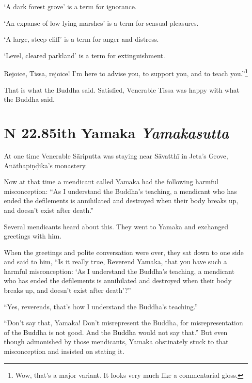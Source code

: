 \documentclass[12pt,openany]{book}%
\newcommand*{\suttatitleacronym}[1]{\smaller[2]{#1}\vspace*{.3em}}
\newcommand*{\suttatitletranslation}[1]{\linebreak{#1}}
\newcommand*{\suttatitleroot}[1]{\linebreak\smaller[2]\itshape{#1}}
\newcommand*{\tocacronym}[1]{\hspace*{-3.3em}{#1}\quad}
\newcommand*{\toctranslation}[1]{#1}
\newcommand*{\tocroot}[1]{(\textit{#1})}
\begin{document}
‘A dark forest grove’ is a term for ignorance. 

‘An expanse of low-lying marshes’ is a term for sensual pleasures. 

‘A large, steep cliff’ is a term for anger and distress. 

‘Level, cleared parkland’ is a term for extinguishment. 

Rejoice, Tissa, rejoice! I’m here to advise you, to support you, and to teach you.”\footnote{Wow, that’s a major variant. It looks very much like a commentarial gloss. } 

That is what the Buddha said. Satisfied, Venerable Tissa was happy with what the Buddha said. 

%
\section*{{\suttatitleacronym SN 22.85}{\suttatitletranslation With Yamaka }{\suttatitleroot Yamakasutta}}
\addcontentsline{toc}{section}{\tocacronym{SN 22.85} \toctranslation{With Yamaka } \tocroot{Yamakasutta}}

At one time Venerable \textsanskrit{Sāriputta} was staying near \textsanskrit{Sāvatthī} in Jeta’s Grove, \textsanskrit{Anāthapiṇḍika}’s monastery. 

Now at that time a mendicant called Yamaka had the following harmful misconception: “As I understand the Buddha’s teaching, a mendicant who has ended the defilements is annihilated and destroyed when their body breaks up, and doesn’t exist after death.” 

Several mendicants heard about this. They went to Yamaka and exchanged greetings with him. 

When the greetings and polite conversation were over, they sat down to one side and said to him, “Is it really true, Reverend Yamaka, that you have such a harmful misconception: ‘As I understand the Buddha’s teaching, a mendicant who has ended the defilements is annihilated and destroyed when their body breaks up, and doesn’t exist after death’?” 

“Yes, reverends, that’s how I understand the Buddha’s teaching.” 

“Don’t say that, Yamaka! Don’t misrepresent the Buddha, for misrepresentation of the Buddha is not good. And the Buddha would not say that.” But even though admonished by those mendicants, Yamaka obstinately stuck to that misconception and insisted on stating it. 
\end{document}
